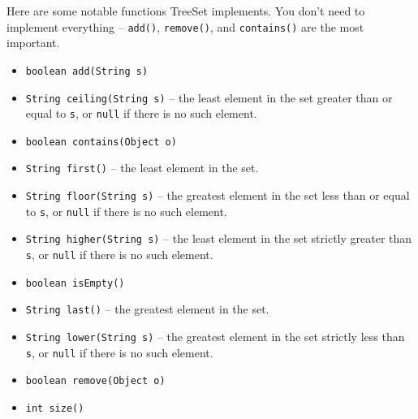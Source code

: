 \documentclass[11pt]{book}
\begin{document}
\begin{center}
\end{center}

Here are some notable functions TreeSet implements. You don't need to implement everything -- \texttt{add()}, \texttt{remove()}, and \texttt{contains()} are the most important.

\begin{itemize}

\item
\texttt{boolean add(String s)}

\item
\texttt{String ceiling(String s)} -- the least element in the set greater than or equal to \texttt{s}, or \texttt{null} if there is no such element.

\item
\texttt{boolean contains(Object o)}

\item
\texttt{String first()} -- the least element in the set.

\item
\texttt{String floor(String s)} -- the greatest element in the set less than or equal to \texttt{s}, or \texttt{null} if there is no such element.

\item
\texttt{String higher(String s)} -- the least element in the set strictly greater than \texttt{s}, or \texttt{null} if there is no such element.

\item
\texttt{boolean isEmpty()}

\item
\texttt{String last()} -- the greatest element in the set.

\item
\texttt{String lower(String s)} -- the greatest element in the set strictly less than \texttt{s}, or \texttt{null} if there is no such element.

\item
\texttt{boolean remove(Object o)}

\item
\texttt{int size()}

\end{itemize}
\end{document}
